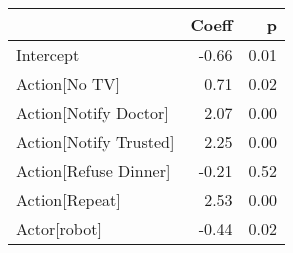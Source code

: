 \begin{tabular}{lrr}
\toprule
{} &  Coeff &    p \\
\midrule
Intercept                &  -0.66 & 0.01 \\
Action[No TV]          &   0.71 & 0.02 \\
Action[Notify Doctor]  &   2.07 & 0.00 \\
Action[Notify Trusted] &   2.25 & 0.00 \\
Action[Refuse Dinner]  &  -0.21 & 0.52 \\
Action[Repeat]         &   2.53 & 0.00 \\
Actor[robot]           &  -0.44 & 0.02 \\
\bottomrule
\end{tabular}
